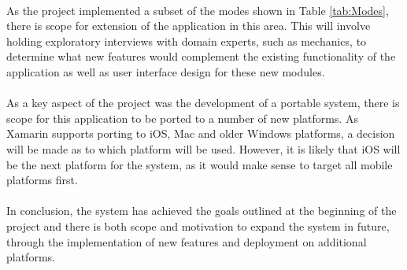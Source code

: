 	\paragraph{}{
	As the project implemented a subset of the modes shown in Table \ref{tab:Modes}, there is scope for extension of the application in this area. This will involve holding exploratory interviews with domain experts, such as mechanics, to determine what new features would complement the existing functionality of the application as well as user interface design for these new modules.
	}
	
	\paragraph{}{
	As a key aspect of the project was the development of a portable system, there is scope for this application to be ported to a number of new platforms. As Xamarin supports porting to iOS, Mac and older Windows platforms, a decision will be made as to which platform will be used. However, it is likely that iOS will be the next platform for the system, as it would make sense to target all mobile platforms first.
	}
	\paragraph{}{
	In conclusion, the system has achieved the goals outlined at the beginning of the project and there is both scope and motivation to expand the system in future, through the implementation of new features and deployment on additional platforms.
	}
